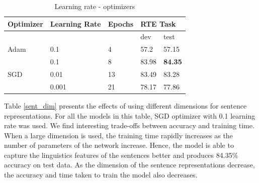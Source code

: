 \documentclass[12pt]{report} %
\begin{document}
\begin{table}[]
	\centering
	\caption{Learning rate - optimizers}
	\label{lr-opt}
	\begin{tabular}{|l|l|l|l|l|}
		\hline
		Optimizer            & Learning  Rate & Epochs & \multicolumn{2}{l|}{RTE Task} \\ \hline
		&                &        & dev           & test          \\ \hline
		Adam                 & 0.1            & 4      & 57.2          & 57.15         \\ \hline
		\multirow{3}{*}{SGD} & 0.1            & 8     & 83.98         & \textbf{84.35}         \\ \cline{2-5} 
		& 0.01           & 13     & 83.49         & 83.28         \\ \cline{2-5} 
		& 0.001          & 21     & 78.17         & 77.86         \\ \hline
	\end{tabular}
\end{table}


Table \ref{sent_dim} presents the effects of using different dimensions for sentence representations. For all the models in this table, SGD optimizer with 0.1 learning rate was used. We find interesting trade-offs between accuracy and training time.  When a  large dimension is used, the training time rapidly increases as the number of parameters of the network increase. Hence, the model is able to capture the linguistics features of the sentences better and produces 84.35\% accuracy on test data. As the dimension of the sentence representations decrease,  the accuracy and time taken to train the model also decreases.
\end{document}
